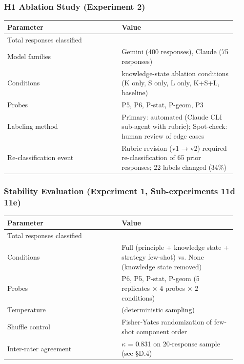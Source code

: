 \documentclass[
]{article}
\newcounter{none} %
\begin{document}
\subsubsection{H1 Ablation Study (Experiment 2)}\label{h1-ablation-study-experiment-2}

{\def\LTcaptype{none} %
\begin{longtable}[]{@{}>{\raggedright\arraybackslash}p{0.465\linewidth}>{\raggedright\arraybackslash}p{0.465\linewidth}@{}}
\toprule\noalign{}
Parameter & Value \\
\midrule\noalign{}
\endhead
\bottomrule\noalign{}
\endlastfoot
Total responses classified & 475 \\
Model families & Gemini (400 responses), Claude (75 responses) \\
Conditions & 5 knowledge-state ablation conditions (K only, S only, L only, K+S+L, baseline) \\
Probes & P5, P6, P-stat, P-geom, P3 \\
Labeling method & Primary: automated (Claude CLI sub-agent with rubric); Spot-check: human review of edge cases \\
Re-classification event & Rubric revision (v1 → v2) required re-classification of 65 prior responses; 22 labels changed (34\%) \\
\end{longtable}
}

\subsubsection{Stability Evaluation (Experiment 1, Sub-experiments 11d--11e)}\label{stability-evaluation-experiment-1-sub-experiments-11d11e}

{\def\LTcaptype{none} %
\begin{longtable}[]{@{}>{\raggedright\arraybackslash}p{0.465\linewidth}>{\raggedright\arraybackslash}p{0.465\linewidth}@{}}
\toprule\noalign{}
Parameter & Value \\
\midrule\noalign{}
\endhead
\bottomrule\noalign{}
\endlastfoot
Total responses classified & 40 \\
Conditions & Full (principle + knowledge state + strategy few-shot) vs. None (knowledge state removed) \\
Probes & P6, P5, P-stat, P-geom (5 replicates × 4 probes × 2 conditions) \\
Temperature & 0 (deterministic sampling) \\
Shuffle control & Fisher-Yates randomization of few-shot component order \\
Inter-rater agreement & $\kappa$ = 0.831 on 20-response sample (see §D.4) \\
\end{longtable}
}
\end{document}
